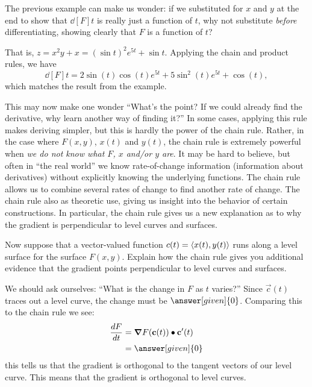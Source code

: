\documentclass{ximera}
\begin{document}
The previous example can make us wonder: if we substituted for $x$ and
$y$ at the end to show that $\dd[F]{t}$ is really just a function of
$t$, why not substitute \textit{before} differentiating, showing
clearly that $F$ is a function of $t$?

That is, $z = x^2y+x = (\sin t)^2e^{5t}+\sin t.$ Applying the chain
and product rules, we have
\[
\dd[F]{t} = 2\sin(t)\cos(t) e^{5t}+ 5\sin^2(t) e^{5t}+\cos(t),
\]
which matches the result from the example.

This may now make one wonder ``What's the point? If we could already
find the derivative, why learn another way of finding it?'' In some
cases, applying this rule makes deriving simpler, but this is hardly
the power of the chain rule. Rather, in the case where $F(x,y)$,
$x(t)$ and $y(t)$, the chain rule is extremely powerful when
\textit{we do not know what $F$, $x$ and/or $y$ are}. It may be hard
to believe, but often in ``the real world'' we know rate-of-change
information (information about derivatives) without explicitly knowing
the underlying functions. The chain rule allows us to combine several
rates of change to find another rate of change. The chain rule also as
theoretic use, giving us insight into the behavior of certain
constructions. In particular, the chain rule gives us a new
explanation as to why the gradient is perpendicular to level curves
and surfaces.

\begin{example}
  Now suppose that a vector-valued function $c(t)=\left\langle x(t),y(t)\right\rangle$
  runs along a level surface for the surface $F(x,y)$. Explain how the
  chain rule gives you additional evidence that the gradient points
  perpendicular to level curves and surfaces.
  \begin{explanation}
    We should ask ourselves: ``What is the change in $F$ as $t$
    varies?''  Since $\vec{c}(t)$ traces out a level curve, the change
    must be $\answer[given]{0}$. Comparing this to the chain rule we see:
    \begin{align*}
    \dd[F]{t} &= \grad F(\vec{c}(t)) \dotp \vec{c}'(t) \\
    &= \answer[given]{0}
    \end{align*}
    this tells us that the gradient is orthogonal to the tangent
    vectors of our level curve. This means that the gradient is
    orthogonal to level curves.
  \end{explanation}
\end{example}
\end{document}

